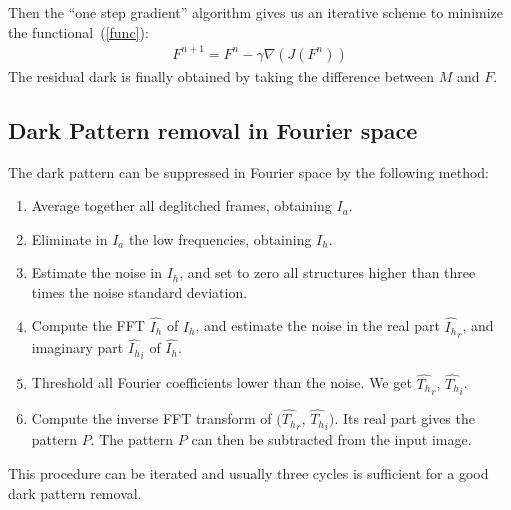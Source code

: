 Then the ``one step gradient'' algorithm gives us an iterative scheme
to minimize the functional~(\ref{func}):
\begin{eqnarray}
F^{n+1} = F^{n} - \gamma \nabla(J(F^n))
\end{eqnarray}
The residual dark is finally obtained by taking the difference between
$M$ and $F$.

\subsection{Dark Pattern removal in   Fourier space}

The dark pattern can be suppressed in   Fourier space by the
following method:

\begin{enumerate}
\item Average together all deglitched frames, obtaining $I_a$.

\item Eliminate in $I_a$ the low frequencies, obtaining $I_h$.

\item Estimate the noise in $I_h$, and set to zero all structures 
higher than three times the noise standard deviation.

\item Compute the FFT $\hat{I_h}$ of $I_h$, and estimate the noise in the
real part $\hat{I_h}_r$, and imaginary part $\hat{I_h}_i$ of
$\hat{I_h}$.

\item Threshold all Fourier coefficients lower than the noise. 
We get $\hat{T_h}_r$, $\hat{T_h}_i$.

\item Compute the inverse FFT transform of 
$(\hat{T_h}_r$, $\hat{T_h}_i)$. Its real part gives the pattern
$P$.  The pattern $P$ can then be subtracted from the input image.

\end{enumerate}

This procedure can be iterated and usually three cycles is 
sufficient for a good dark pattern removal.


